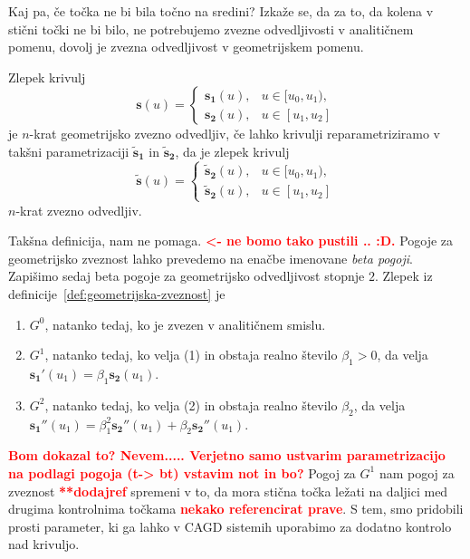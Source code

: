 \documentclass[isrm2, tisk]{fmfdelo}
\newcommand{\mycomment}[1]{\textbf{\textcolor{red}{#1}}}
\begin{document}
    Kaj pa, če točka ne bi bila točno na sredini?
    Izkaže se, da za to, da kolena v stični točki ne bi bilo, ne potrebujemo zvezne odvedljivosti v analitičnem pomenu, dovolj je zvezna odvedljivost v geometrijskem pomenu.
    \begin{definicija}
        \label{def:geometrijska-zveznost}
        Zlepek krivulj \[\mathbf{s}(u) = \begin{cases}
                                             \mathbf{s_1}(u), & u \in [u_0,u_1),  \\
                                             \mathbf{s_2}(u), & u \in [u_1,u_2]
        \end{cases}\] je $n$-krat geometrijsko zvezno odvedljiv, če lahko krivulji reparametriziramo v takšni parametrizaciji $\mathbf{\tilde{s}_1}$ in $\mathbf{\tilde{s}_2}$, da je zlepek krivulj
        \[\mathbf{\tilde{s}}(u) = \begin{cases}
                                      \mathbf{\tilde{s}_2}(u), & u \in [u_0,u_1),  \\
                                      \mathbf{\tilde{s}_2}(u), & u \in [u_1,u_2]
        \end{cases}\] $n$-krat zvezno odvedljiv.
    \end{definicija}
    Takšna definicija, nam ne pomaga. \mycomment{<- ne bomo tako pustili .. :D.}
    Pogoje za geometrijsko zveznost lahko prevedemo na enačbe imenovane \textit{beta pogoji}.
    Zapišimo sedaj beta pogoje za geometrijsko odvedljivost stopnje $2$.
    Zlepek iz definicije~\ref{def:geometrijska-zveznost} je
    \begin{enumerate}
        \item $G^0$, natanko tedaj, ko je zvezen v analitičnem smislu.
        \item $G^1$, natanko tedaj, ko velja (1) in obstaja realno število $\beta_1>0$, da velja $\mathbf{s_1'}(u_1) =\beta_1\mathbf{s_2}(u_1)$.
        \item $G^2$, natanko tedaj, ko velja (2) in obstaja realno število $\beta_2$, da velja $\mathbf{s_1''}(u_1) =\beta_1^2\mathbf{s_2''}(u_1) + \beta_2\mathbf{s_2''}(u_1)$.
    \end{enumerate}
    \mycomment{Bom dokazal to? Nevem..... Verjetno samo ustvarim parametrizacijo na podlagi pogoja (t-> bt) vstavim not in bo?}
    Pogoj za $G^1$ nam pogoj za zveznost \mycomment{**dodajref} spremeni v to, da mora stična točka ležati na daljici med drugima kontrolnima točkama \mycomment{nekako referencirat prave}.
    S tem, smo pridobili prosti parameter, ki ga lahko v CAGD sistemih uporabimo za dodatno kontrolo nad krivuljo.
\end{document}
